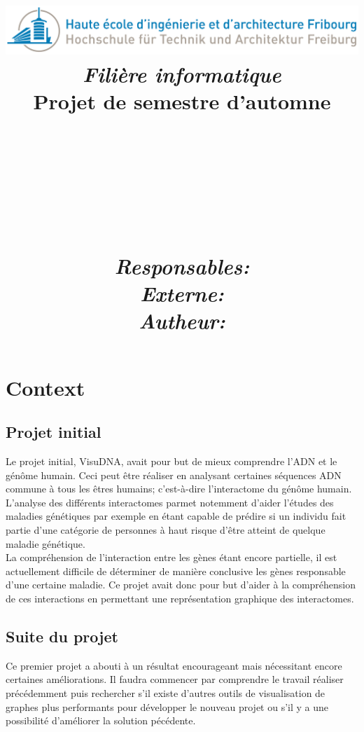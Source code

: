 \documentclass{article}
\title{
  \includegraphics[width=0.9\columnwidth]{Logo_HEIA}\\
  \vspace{1cm}
  \textmd{\textit{Filière informatique}} \\
  \vspace{2cm}
  \textmd{Projet de semestre d'automne}\\
  \textmd{\projDate}\\
  \vspace{1.5cm}
  \noindent\makebox[\linewidth]{\rule{\textwidth}{0.5pt}}\\
  \vspace{.5cm}
  \textmd{\textbf{\projName}}\\
  \textmd{\textbf{\docTitle}}\\
  \noindent\makebox[\linewidth]{\rule{\textwidth}{0.5pt}}\\
  \Large
  \vspace{3cm}
  \textit{Responsables:} \projSupervisors \\
  \vspace{1cm}
  \textit{Externe:} \projInitiator \\
  \vspace{1cm}
  \textit{Autheur:} \projAuthorName \\
  \author{}
}
\date{} %
\begin{document}
\maketitle


 \newpage



\section{Context}
\subsection{Projet initial}
  Le projet initial, VisuDNA, avait pour but de mieux comprendre l'ADN et le génôme humain. Ceci peut être réaliser en analysant certaines séquences ADN commune à tous les êtres humains; c'est-à-dire l'interactome du génôme humain.  L'analyse des différents interactomes parmet notemment d'aider l'études des maladies génétiques par exemple en étant capable de prédire si un individu fait partie d'une catégorie de personnes à haut risque d'être atteint de quelque maladie génétique.
  \\
  La compréhension de l'interaction entre les gènes étant encore partielle, il est actuellement difficile de déterminer de manière conclusive les gènes responsable d'une certaine maladie. Ce projet avait donc pour but d'aider à la compréhension de ces interactions en permettant une représentation graphique des interactomes.
\cite{Sisto:2014}

\subsection{Suite du projet}
  Ce premier projet a abouti à un résultat encourageant mais nécessitant encore certaines améliorations. Il faudra commencer par comprendre le travail réaliser précédemment puis rechercher s'il existe d'autres outils de visualisation de graphes plus performants pour développer le nouveau projet ou s'il y a une possibilité d'améliorer la solution pécédente.
\end{document}
